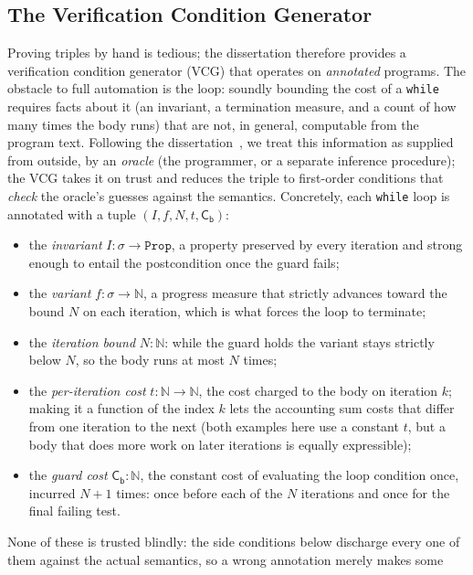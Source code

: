 \documentclass[runningheads]{llncs}
\newcommand{\State}{\sigma}
\newcommand{\Nat}{\mathbb{N}}
\newcommand{\cst}[1]{\mathsf{C_{#1}}}
\newcommand{\code}[1]{\texttt{#1}}
\begin{document}
\subsection{The Verification Condition Generator}

Proving triples by hand is tedious; the dissertation therefore provides a
verification condition generator (VCG) that operates on \emph{annotated}
programs.
The obstacle to full automation is the loop: soundly bounding the cost of a
\code{while} requires facts about it (an invariant, a termination measure, and
a count of how many times the body runs) that are not, in general, computable
from the program text.
Following the dissertation~\cite{Silva2022}, we treat this information as supplied
from outside, by an \emph{oracle} (the programmer, or a separate inference
procedure); the VCG
takes it on trust and reduces the triple to first-order conditions that
\emph{check} the oracle's guesses against the semantics.
Concretely, each \code{while} loop is annotated with a tuple
$(I, f, N, t, \cst{b})$:
\begin{itemize}
\item the \emph{invariant} $I : \State \to \code{Prop}$, a property preserved by
        every iteration and strong enough to entail the postcondition once the guard
        fails;
\item the \emph{variant} $f : \State \to \Nat$, a progress measure that strictly
        advances toward the bound $N$ on each iteration, which is what forces the loop
        to terminate;
\item the \emph{iteration bound} $N : \Nat$: while the guard holds the variant stays
        strictly below $N$, so the body runs at most $N$ times;
\item the \emph{per-iteration cost} $t : \Nat \to \Nat$, the cost charged to the body
        on iteration $k$; making it a function of the index $k$ lets the accounting sum
        costs that differ from one iteration to the next (both examples here use a
        constant $t$, but a body that does more work on later iterations is equally
        expressible);
\item the \emph{guard cost} $\cst{b} : \Nat$, the constant cost of evaluating the
        loop condition once, incurred $N+1$ times: once before each of the $N$
        iterations and once for the final failing test.
\end{itemize}
None of these is trusted blindly: the side conditions below discharge every one of
them against the actual semantics, so a wrong annotation merely makes some
\end{document}
